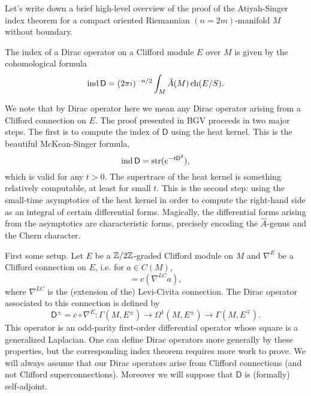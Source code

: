 \documentclass{amsart}
\renewcommand\d{\mathsf{D}}
\begin{document}
Let's write down a brief high-level overview of the proof of the Atiyah-Singer index
theorem for a compact oriented Riemannian $(n=2m)$-manifold $M$ without boundary.
\begin{theorem}
    The index of a Dirac operator on a Clifford module $E$ over $M$ is given
    by the cohomological formula
    \begin{equation*}
        \ind \d = (2\pi i)^{-n/2} \int_M \hat A(M)\ch(E/S).
    \end{equation*}
\end{theorem}
We note that by Dirac operator here we mean any Dirac operator arising from a Clifford
connection on $E$.
The proof presented in BGV proceeds in two major steps. The first is to compute
the index of $\d$ using the heat kernel. This is the beautiful McKean-Singer formula,
\begin{equation*}
    \ind \d = \Str(e^{-t\d^2}),
\end{equation*}
which is valid for any $t>0$. The supertrace of the heat kernel is something
relatively computable, at least for small $t$. This is the second step: using the
small-time asymptotics of the heat kernel in order to compute the right-hand
side as an integral of certain differential forms. Magically, the differential
forms arising from the asymptotics are characteristic forms, precisely encoding
the $\hat A$-genus and the Chern character.

First some setup. Let $E$ be a $\mathbb{Z}/2\mathbb{Z}$-graded Clifford module on $M$
and $\nabla^E$ be a Clifford connection on $E$, i.e. for $a\in C(M)$,
\begin{equation*}
    [\nabla^E, c(a)] = c(\nabla^{LC}a),
\end{equation*}
where $\nabla^{LC}$ is the (extension of the) Levi-Civita connection.
The Dirac operator associated to this connection is defined by
\begin{equation*}
    \d^\pm = c\circ \nabla^E: \Gamma(M,E^\pm) \to \Omega^1(M,E^\pm) \to \Gamma(M,E^\mp).
\end{equation*}
This operator is an odd-parity first-order differential operator whose
square is a generalized Laplacian. One can define Dirac operators more generally by 
these properties, but the corresponding index theorem requires more work to prove.
We will always assume that our Dirac operators arise from Clifford connections (and
not Clifford superconnections). Moreover we will suppose that $\d$ is (formally)
self-adjoint.

\end{document}
